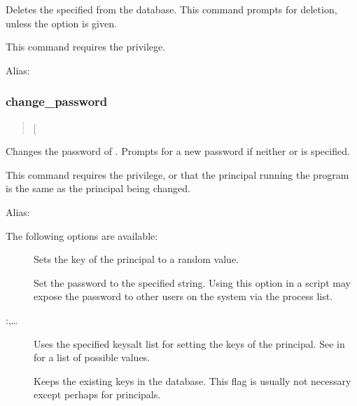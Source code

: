 \documentclass[letterpaper,10pt,english]{sphinxmanual}
\begin{document}
Deletes the specified  from the database.  This command
prompts for deletion, unless the  option is given.

This command requires the  privilege.

Alias: 

\label{\detokenize{admin/admin_commands/kadmin_local:delete-principal-end}}

\subsubsection{change\_password}
\label{\detokenize{admin/admin_commands/kadmin_local:id5}}\label{\detokenize{admin/admin_commands/kadmin_local:delete-principal-end}}\label{\detokenize{admin/admin_commands/kadmin_local:change-password}}\begin{quote}

 {[}\sphinxstyleemphasis{options}{]} 
\end{quote}

Changes the password of .  Prompts for a new password if
neither  or  is specified.

This command requires the  privilege, or that the
principal running the program is the same as the principal being
changed.

Alias: 

The following options are available:
\begin{description}
\item[{}] \leavevmode
Sets the key of the principal to a random value.

\item[{ }] \leavevmode
Set the password to the specified string.  Using this option in a
script may expose the password to other users on the system via
the process list.

\item[{ :,…}] \leavevmode
Uses the specified keysalt list for setting the keys of the
principal.  See {\hyperref[\detokenize{admin/conf_files/kdc_conf:keysalt-lists}]{}} in {\hyperref[\detokenize{admin/conf_files/kdc_conf:kdc-conf-5}]{}} for a
list of possible values.

\item[{}] \leavevmode
Keeps the existing keys in the database.  This flag is usually not
necessary except perhaps for  principals.

\end{description}
\end{document}
